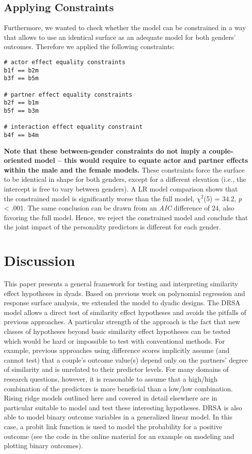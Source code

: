 \documentclass[jou,a4paper,draftfirst]{apa6}
\newcommand{\added}[1]{\textcolor{colour_added}{\bf{#1}}}
\begin{document}
\subsection{Applying Constraints}
Furthermore, we wanted to check whether the model can be constrained in a way that allows to use an identical surface as an adequate model for both genders' outcomes. Therefore we applied the following constraints:

\begin{lstlisting}
# actor effect equality constraints
b1f == b2m
b3f == b5m

# partner effect equality constraints
b2f == b1m
b5f == b3m

# interaction effect equality constraint
b4f == b4m
\end{lstlisting}

\added{Note that these between-gender constraints do not imply a couple-oriented model -- this would require to equate actor and partner effects within the male and the female models.} These constraints force the surface to be identical in shape for both genders, except for a different elevation (i.e., the intercept is free to vary between genders). A LR model comparison shows that the constrained model is significantly worse than the full model, $\chi^2$(5) = 34.2, \textit{p} < .001. The same conclusion can be drawn from an \emph{AIC} difference of 24, also favoring the full model. Hence, we reject the constrained model and conclude that the joint impact of the personality predictors is different for each gender. 



\section{Discussion}
This paper presents a general framework for testing and interpreting similarity effect hypotheses in dyads. Based on previous work on polynomial regression and response surface analysis, we extended the model to dyadic designs. The DRSA model allows a direct test of similarity effect hypotheses and avoids the pitfalls of previous approaches. A particular strength of the approach is the fact that new classes of hypotheses beyond basic similarity effect hypotheses can be tested which would be hard or impossible to test with conventional methods. For example, previous approaches using difference scores implicitly assume (and cannot test) that a couple's outcome value(s) depend only on the partners' degree of similarity and is unrelated to their predictor levels. For many domains of research questions, however, it is reasonable to assume that a high/high combination of the predictors is more beneficial than a low/low combination. Rising ridge models outlined here and covered in detail elsewhere \parencite{schonbrodt_testing_2016} are in particular suitable to model and test these interesting hypotheses. DRSA is also able to model binary outcome variables in a generalized linear model. In this case, a probit link function is used to model the probability for a positive outcome (see the code in the online material for an example on modeling and plotting binary outcomes).
\end{document}
